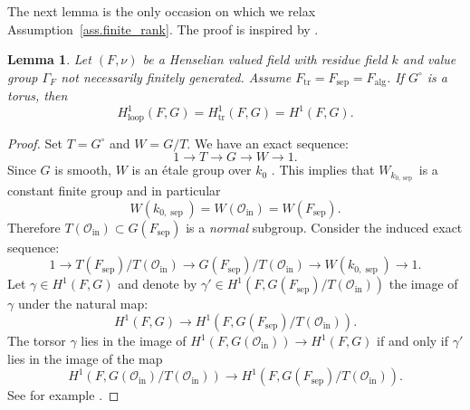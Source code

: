 \documentclass[12pt]{amsart}
\numberwithin{equation}{section}
\newtheorem{lemma}[theorem]{Lemma}
\theoremstyle{definition}
\newcommand{\cO}{\mathcal{O}}
\newcommand{\alg}{\operatorname{alg}}
\newcommand{\sep}{\operatorname{sep}}
\newcommand{\tr}{\operatorname{tr}}
\newcommand{\Ftr}{F_{\tr}}
\newcommand{\Falg}{F_{\alg}}
\newcommand{\oin}{\operatorname{in}}
\newcommand{\Oin}{\cO_{\oin}}
\newcommand{\Fsep}{F_{\sep}}
\newcommand{\lop}{\operatorname{loop}}
\begin{document}
The next lemma is the only occasion on which we relax Assumption~\ref{ass.finite_rank}. The proof is inspired by \cite[6.2]{gille2013torsors}.

\begin{lemma}\label{lem.loop_normalizer_torus}
    Let $(F,\nu)$ be a Henselian valued field with residue field $k$ and value group $\Gamma_F$ not necessarily finitely generated. Assume $\Ftr = \Fsep= \Falg$. If $G^\circ$ is a torus, then $$H^1_{\lop}(F,G) = H^1_{\tr}(F,G) = H^1(F,G).$$
\end{lemma}
\begin{proof}
    Set $T = G^{\circ}$ and $W = G/T$. We have an exact sequence:
    $$1\to T \to G\to W\to 1.$$
    Since $G$ is smooth, $W$ is an \'etale group over $k_0$ \cite[Expose VI, Proposition 5.5.1]{SGA3}. This implies that $W_{k_{0,\sep}}$ is a constant finite group and in particular $$W(k_{0,\sep})=W(\Oin) = W(\Fsep).$$ Therefore $T(\Oin) \subset G(\Fsep)$ is a \emph{normal} subgroup. Consider the induced exact sequence:
    \begin{equation}\label{e.8}
        1\to T(\Fsep)/T(\Oin) \to G(\Fsep)/T(\Oin) \to W(k_{0,\sep}) \to 1.
    \end{equation}
    Let $\gamma \in H^1(F,G)$ and denote by $\gamma'\in H^1(F,G(\Fsep)/T(\Oin))$ the image of $\gamma$ under the natural map:
    $$H^1(F,G) \to H^1(F,G(\Fsep)/T(\Oin)).$$
    The torsor $\gamma$ lies in the image of $H^1(F,G(\Oin))\to H^1(F,G)$ if and only if $\gamma'$ lies in the image of the map
    $$H^1(F,G(\Oin)/T(\Oin))\to H^1(F,G(\Fsep)/T(\Oin)).$$ 
    See for example \cite[Lemma 3.1]{ofek2022reduction}.
    

\end{proof}
\end{document}
